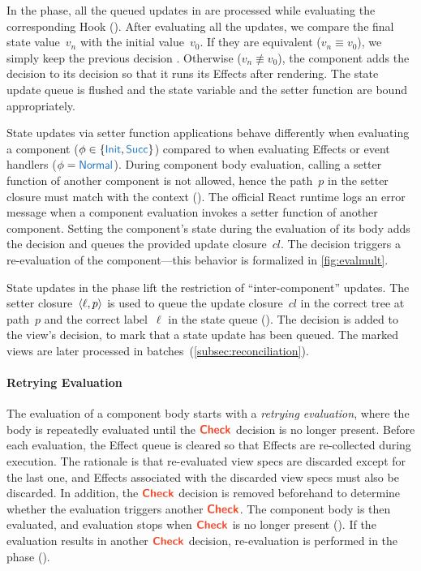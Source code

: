 In the  phase, all the queued updates in  are processed while evaluating the corresponding  Hook ().
After evaluating all the updates, we compare the final state value~$v_n$ with the initial value~$v_0$.
If they are equivalent ($v_n \equiv v_0$), we simply keep the previous decision .
Otherwise ($v_n \nequiv v_0$), the component adds the  decision to its decision so that it runs its Effects after rendering.
The state update queue  is flushed and the state variable and the setter function are bound appropriately.

State updates via setter function applications behave differently when evaluating a component ($\phi \in \{\phase{Init}, \phase{Succ}\}$) compared to when evaluating Effects or event handlers ($\phi = \phase{Normal}$).
During component body evaluation, calling a setter function of another component is not allowed, hence the path~$p$ in the setter closure must match with the context ().
The official React runtime logs an error message when a component evaluation invokes a setter function of another component.
Setting the component's state during the evaluation of its body adds the  decision and queues the provided update closure~$cl$.
The  decision triggers a re-evaluation of the component---this behavior is formalized in \cref{fig:evalmult}.

State updates in the  phase lift the restriction of ``inter-component'' updates.
The setter closure~$\langle\ell, p\rangle$ is used to queue the update closure~$cl$ in the correct tree at path~$p$ and the correct label~$\ell$ in the state queue  ().
The  decision is added to the view's decision, to mark that a state update has been queued.
The marked views are later processed in batches~(\cref{subsec:reconciliation}).

\paragraph{Retrying Evaluation}
The evaluation of a component body starts with a \emph{retrying evaluation}, where the body is repeatedly evaluated until the \(\dec{Check}\) decision is no longer present.
Before each evaluation, the Effect queue is cleared so that Effects are re-collected during execution.
The rationale is that re-evaluated view specs are discarded except for the last one, and Effects associated with the discarded view specs must also be discarded.
In addition, the \(\dec{Check}\) decision is removed beforehand to determine whether the evaluation triggers another \(\dec{Check}\).
The component body is then evaluated, and evaluation stops when \(\dec{Check}\) is no longer present ().
If the evaluation results in another \(\dec{Check}\) decision, re-evaluation is performed in the  phase ().

